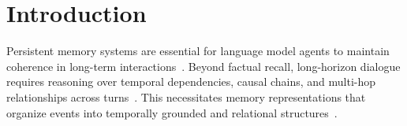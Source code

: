 \section{Introduction}













 


Persistent memory systems are essential for language model agents to maintain coherence in long-term interactions~\cite{park2023generative}. 
Beyond factual recall, long-horizon dialogue requires reasoning over temporal dependencies, causal chains, and multi-hop relationships across turns~\cite{weller2025theoreticallimitationsembeddingbasedretrieval,huang2025licomemory,maharana2024evaluating,wu2024longmemeval,yang2018hotpotqa}. This necessitates memory representations that organize events into temporally grounded and relational structures~\cite{kwiatkowski2019natural}. 

